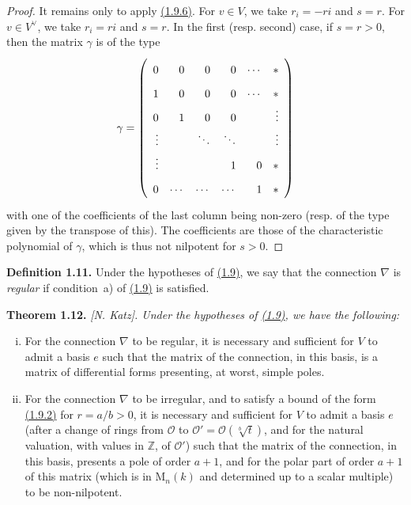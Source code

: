 \documentclass{report}
\newenvironment{itenv}[1]
  {\phantomsection\par\medskip\noindent\textbf{#1.}\itshape}
  {\medskip}
\newenvironment{rmenv}[1]
  {\phantomsection\par\medskip\noindent\textbf{#1.}\rmfamily}
  {\medskip}
\renewcommand{\cal}[1]{{\mathcal{#1}}}
\newcommand{\ZZ}{\mathbb{Z}}
\newcommand{\MM}{\mathrm{M}}
\newcommand{\oldpage}[1]{\marginpar{\footnotesize$\Big\vert$ \textit{p.~#1}}}
\begin{document}
\begin{proof}
  It remains only to apply \hyperref[II.1.9.6]{(1.9.6)}.
  For $v\in V$, we take $r_i=-ri$ and $s=r$.
  For $v\in V^\vee$, we take $r_i=ri$ and $s=r$.
  In the first (resp. second) case, if $s=r>0$, then the matrix $\gamma$ is of the type
  \[
    \gamma =
    \left(
      \def\arraystretch{1.8}
      \begin{array}{rrrrrr}
        0 & 0 & 0 & 0 & \cdots & *
      \\1 & 0 & 0 & 0 & \cdots & *
      \\0 & 1 & 0 & 0 & & \vdots
      \\\vdots & & \ddots & \ddots & & \vdots
      \\\vdots & & & 1 & 0 & *
      \\0 & \cdots & \cdots & \cdots & 1 & *
      \end{array}
    \right)
  \]
  with one of the coefficients of the last column being non-zero (resp. of the type given by the transpose of this).
  The coefficients are those of the characteristic polynomial of $\gamma$, which is thus not nilpotent for $s>0$.
\end{proof}

\begin{rmenv}{Definition 1.11}
\label{II.1.11}
  Under the hypotheses of \hyperref[II.1.9]{(1.9)}, we say that the connection $\nabla$ is \emph{regular} if condition~a) of \hyperref[II.1.9]{(1.9)} is satisfied.
\end{rmenv}

\begin{itenv}{Theorem 1.12}
\label{II.1.12}
  \emph{[N. Katz].}
  Under the hypotheses of \hyperref[II.1.9]{(1.9)}, we have the following:
  \begin{enumerate}[(i)]
    \item For the connection $\nabla$ to be regular, it is necessary and sufficient for $V$ to admit
\oldpage{51}
      a basis $e$ such that the matrix of the connection, in this basis, is a matrix of differential forms presenting, at worst, simple poles.
    \item For the connection $\nabla$ to be irregular, and to satisfy a bound of the form \hyperref[II.1.9.2]{(1.9.2)} for $r=a/b>0$, it is necessary and sufficient for $V$ to admit a basis $e$ (after a change of rings from $\cal{O}$ to $\cal{O}'=\cal{O}(\sqrt[b]{t})$, and for the natural valuation, with values in $\ZZ$, of $\cal{O}'$) such that the matrix of the connection, in this basis, presents a pole of order $a+1$, and for the polar part of order $a+1$ of this matrix (which is in $\MM_n(k)$ and determined up to a scalar multiple) to be non-nilpotent.
  \end{enumerate}
\end{itenv}
\end{document}
